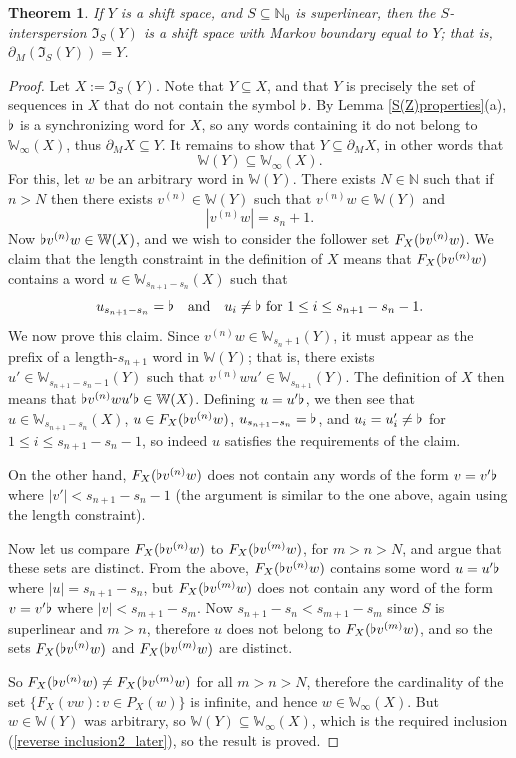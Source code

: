 \documentclass[reqno,11pt]{amsart}
\newtheorem{thm}{Theorem}[section]
\theoremstyle{definition}
\theoremstyle{remark}
\theoremstyle{remark}
\def \N {\mathbb N}
\def\w{\mathbb{W}}
\def\i{\mathfrak{I}}
\def\b{\kern 0.02em \flat \kern 0.02em}
\numberwithin{equation}{section}
\begin{document}
\begin{thm}\label{prescribed_markov_boundary}
If $Y$ is a shift space, and $S\subseteq \N_0$ is superlinear, then 
the $S$-interspersion $\i_S(Y)$ is a shift space with
Markov boundary equal to $Y$; that is, $\partial_M ( \i_S(Y)) = Y$.
\end{thm}
\begin{proof}
Let $X:=\i_S(Y)$.
Note that $Y\subseteq X$, and that $Y$ is precisely the set of sequences in $X$ that do not contain the symbol $\b$.
By Lemma \ref{S(Z)properties}(a), 
$\b$ is a synchronizing word for $X$,
so any words containing it do not belong to $\w_\infty(X)$,
thus
$
\partial_M X \subseteq Y
$.
It remains to show that
$Y \subseteq \partial_M X$,
in other words that 
\begin{equation}\label{reverse inclusion2_later}
\w(Y) \subseteq \w_\infty(X).
\end{equation}
For this, let $w$ be an arbitrary word in $\w(Y)$.
There exists $N\in\N$ such that if
 $n>N$ then there exists $v^{(n)}\in\w(Y)$ such that $v^{(n)} w\in\w(Y)$ and
\begin{equation*}\label{length choice}
| v^{(n)}w| = s_n +1.
\end{equation*}
Now $\b v^{(n)}w\in\w(X)$, and we wish to consider the follower set $F_{X}(\b v^{(n)}w)$.
We claim that the length constraint 
in the definition of $X$ means that 
$F_{X}( \b v^{(n)}w)$ contains a word $u\in\w_{s_{n+1}-s_n}(X)$ 
such that 
$$u_{s_{n+1}-s_n}=\b\quad\text{and}\quad
u_i\neq \b\text{ for }1\le i\le s_{n+1}-s_n-1.$$
We now prove this claim. 
Since $v^{(n)}w\in \w_{s_n+1}(Y)$, it must appear as the prefix of a length-$s_{n+1}$ word in $\w(Y)$; 
that is, there exists 
$u'\in \w_{s_{n+1}-s_n-1}(Y)$ such that $v^{(n)}wu'\in \w_{s_{n+1}}(Y)$.
The definition of $X$ then means that $\b v^{(n)}wu'\b\in \w(X)$. 
Defining $u=u'\b$, we then see that 
 $u\in \w_{s_{n+1}-s_n}(X)$, $u\in F_{X}( \b v^{(n)}w)$, $u_{s_{n+1}-s_n}=\b$, 
and $u_i=u'_i\neq \b$ for $1\le i\le s_{n+1}-s_n-1$, so indeed $u$ satisfies the requirements of the claim.

On the other hand, $F_{X}( \b v^{(n)}w)$ does not contain any words of the form
$v=v'\b$ where $|v'|<s_{n+1}-s_n-1$ (the argument is similar to the one above, again using the length constraint).

Now let us compare $F_{X}( \b v^{(n)}w)$ to $F_{X}( \b v^{(m)}w)$, for $m>n>N$, and argue that these sets are distinct.
From the above, $F_{X}( \b v^{(n)}w)$ contains some word $u=u'\b$ where $|u|=s_{n+1}-s_n$,
but $F_{X}( \b v^{(m)}w)$ does not contain any word of the form $v=v'\b$
where $|v|<s_{m+1}-s_{m}$.
Now $s_{n+1}-s_n < s_{m+1}-s_{m}$ since $S$ is superlinear and $m>n$,
therefore $u$ does not belong to $F_{X}( \b v^{(m)}w)$,
and so the sets $F_{X}( \b v^{(n)}w)$ and $F_{X}( \b v^{(m)}w)$ are distinct.

So  $F_{X}( \b v^{(n)}w) \neq F_{X}( \b v^{(m)}w)$
for all $m>n>N$,
therefore the cardinality of the set
$
 \{ F_{X}(vw) : v\in P_{X}(w) \}
$
is infinite,
and hence $w\in \w_\infty(X)$.
But $w\in \w(Y)$ was arbitrary, so 
$\w(Y) \subseteq \w_\infty(X)$, which is the required inclusion (\ref{reverse inclusion2_later}),
so the result is proved.
\end{proof}
\end{document}
